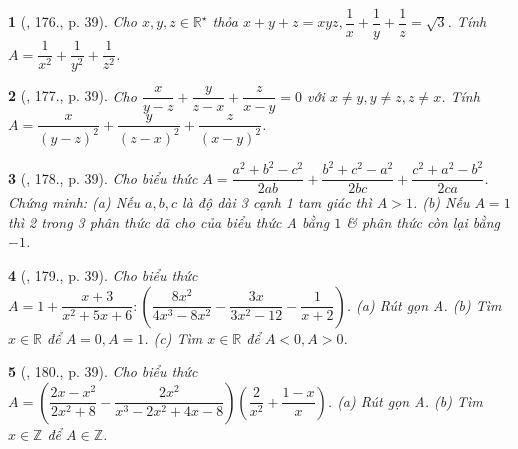\documentclass{article}
\newtheorem{baitoan}{}
\begin{document}
\begin{baitoan}[\cite{Tuyen_Toan_8}, 176., p. 39]
	Cho $x,y,z\in\mathbb{R}^\star$ thỏa $x + y + z = xyz,\dfrac{1}{x} + \dfrac{1}{y} + \dfrac{1}{z} = \sqrt{3}$. Tính $A = \dfrac{1}{x^2} + \dfrac{1}{y^2} + \dfrac{1}{z^2}$.
\end{baitoan}

\begin{baitoan}[\cite{Tuyen_Toan_8}, 177., p. 39]
	Cho $\dfrac{x}{y - z} + \dfrac{y}{z - x} + \dfrac{z}{x - y} = 0$ với $x\ne y,y\ne z,z\ne x$. Tính $A = \dfrac{x}{(y - z)^2} + \dfrac{y}{(z - x)^2} + \dfrac{z}{(x - y)^2}$.
\end{baitoan}

\begin{baitoan}[\cite{Tuyen_Toan_8}, 178., p. 39]
	Cho biểu thức $A = \dfrac{a^2 + b^2 - c^2}{2ab} + \dfrac{b^2 + c^2 - a^2}{2bc} + \dfrac{c^2 + a^2 - b^2}{2ca}$. Chứng minh: (a) Nếu $a,b,c$ là độ dài 3 cạnh 1 tam giác thì $A > 1$. (b) Nếu $A = 1$ thì 2 trong 3 phân thức dã cho của biểu thức A bằng $1$ \& phân thức còn lại bằng $-1$.
\end{baitoan}

\begin{baitoan}[\cite{Tuyen_Toan_8}, 179., p. 39]
	Cho biểu thức $A = 1 + \dfrac{x + 3}{x^2 + 5x + 6}:\left(\dfrac{8x^2}{4x^3 - 8x^2} - \dfrac{3x}{3x^2 - 12} - \dfrac{1}{x + 2}\right)$. (a) Rút gọn A. (b) Tìm $x\in\mathbb{R}$ để $A = 0,A = 1$. (c) Tìm $x\in\mathbb{R}$ để $A < 0,A > 0$.
\end{baitoan}

\begin{baitoan}[\cite{Tuyen_Toan_8}, 180., p. 39]
	Cho biểu thức $A = \left(\dfrac{2x - x^2}{2x^2 + 8} - \dfrac{2x^2}{x^3 - 2x^2 + 4x - 8}\right)\left(\dfrac{2}{x^2} + \dfrac{1 - x}{x}\right)$. (a) Rút gọn A. (b) Tìm $x\in\mathbb{Z}$ để $A\in\mathbb{Z}$.
\end{baitoan}


\printbibliography[heading=bibintoc]
	
\end{document}
